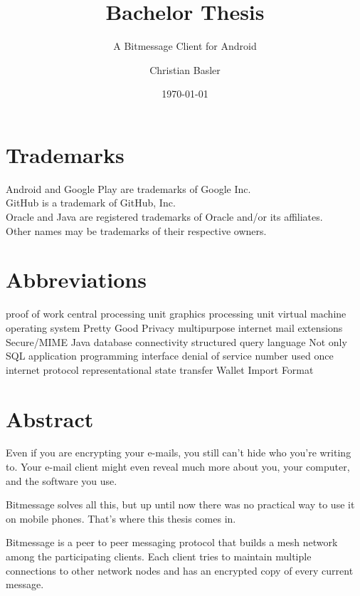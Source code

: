 \documentclass{bfh}
\title{Bachelor Thesis}
\subtitle{A Bitmessage Client for Android\texttrademark}
\author{Christian Basler}
\date{\today}
\begin{document}
  \lstset{language=Java}
  \maketitle

  \section*{Trademarks}
  Android and Google Play are trademarks of Google Inc.\\
  GitHub is a trademark of GitHub, Inc.\\
  Oracle and Java are registered trademarks of Oracle and/or its affiliates.\\
  Other names may be trademarks of their respective owners.

  \section*{Abbreviations}
  \begin{acronym}[S/MIME ]
        {proof of work}
        {central processing unit}
        {graphics processing unit}
         {virtual machine}
         {operating system}
        {Pretty Good Privacy}
       {multipurpose internet mail extensions}
     {Secure/\acs{MIME}}
       {Java database connectivity}
        {structured query language}
      {Not only \acs{SQL}}
        {application programming interface}
        {denial of service}
      {number used once}
         {internet protocol}
       {representational state transfer}
        {Wallet Import Format}
  \end{acronym}


  \newpage
  \section*{Abstract}
  Even if you are encrypting your e-mails, you still can't hide who you're writing to. Your e-mail client might even reveal much more about you, your computer, and the software you use.

  Bitmessage solves all this, but up until now there was no practical way to use it on mobile phones. That's where this thesis comes in.


  Bitmessage is a peer to peer messaging protocol that builds a mesh network among the participating clients. Each client tries to maintain multiple connections to other network nodes and has an encrypted copy of every current message.
\end{document}
